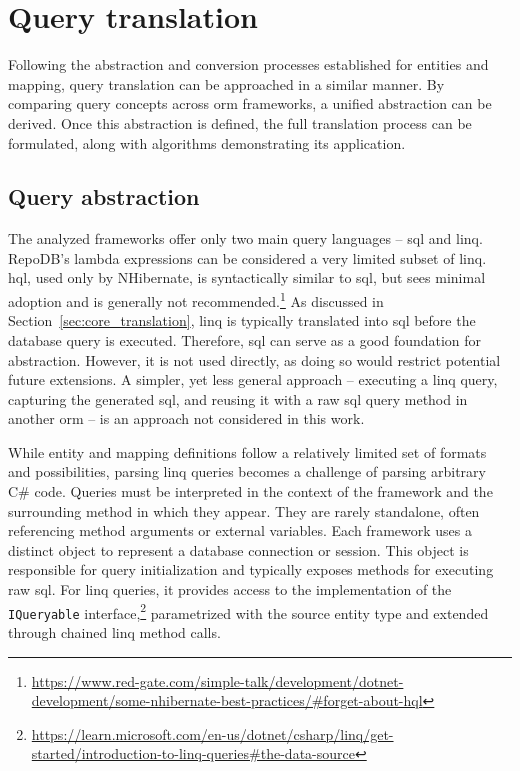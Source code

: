 \chapter{Query translation}\label{chapter:query_translation}
Following the abstraction and conversion processes established for entities and mapping, query translation can be approached in a similar manner. By comparing query concepts across \acrshort{orm} frameworks, a unified abstraction can be derived. Once this abstraction is defined, the full translation process can be formulated, along with algorithms demonstrating its application. 


\section{Query abstraction}
The analyzed frameworks offer only two main query languages -- \acrshort{sql} and \acrshort{linq}. RepoDB's lambda expressions can be considered a very limited subset of \acrshort{linq}. \acrshort{hql}, used only by NHibernate, is syntactically similar to \acrshort{sql}, but sees minimal adoption and is generally not recommended.\footnote{\url{https://www.red-gate.com/simple-talk/development/dotnet-development/some-nhibernate-best-practices/\#forget-about-hql}} As discussed in Section~\ref{sec:core_translation}, \acrshort{linq} is typically translated into \acrshort{sql} before the database query is executed. Therefore, \acrshort{sql} can serve as a good foundation for abstraction. However, it is not used directly, as doing so would restrict potential future extensions. A simpler, yet less general approach -- executing a \acrshort{linq} query, capturing the generated \acrshort{sql}, and reusing it with a raw \acrshort{sql} query method in another \acrshort{orm} -- is an approach not considered in this work.

While entity and mapping definitions follow a relatively limited set of formats and possibilities, parsing \acrshort{linq} queries becomes a challenge of parsing arbitrary C\# code. Queries must be interpreted in the context of the framework and the surrounding method in which they appear. They are rarely standalone, often referencing method arguments or external variables. Each framework uses a distinct object to represent a database connection or session. This object is responsible for query initialization and typically exposes methods for executing raw \acrshort{sql}. For \acrshort{linq} queries, it provides access to the implementation of the \texttt{IQueryable} interface,\footnote{\url{https://learn.microsoft.com/en-us/dotnet/csharp/linq/get-started/introduction-to-linq-queries\#the-data-source}} parametrized with the source entity type and extended through chained \acrshort{linq} method calls.

